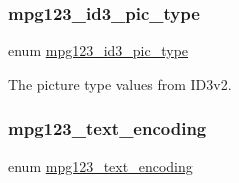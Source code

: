 \subsubsection{\texorpdfstring{mpg123\+\_\+id3\+\_\+pic\+\_\+type}{mpg123\_id3\_pic\_type}\hspace{0.1cm}{\footnotesize\ttfamily [2/2]}}
{\footnotesize\ttfamily enum \hyperlink{group__mpg123__metadata_gaf40652195dd80e2b06dc031c9902840e}{mpg123\+\_\+id3\+\_\+pic\+\_\+type}}

The picture type values from I\+D3v2. \mbox{\label{group__mpg123__metadata_ga489b4cd5fb8d1d826e38b09bed9294ce}} 
\subsubsection{\texorpdfstring{mpg123\+\_\+text\+\_\+encoding}{mpg123\_text\_encoding}\hspace{0.1cm}{\footnotesize\ttfamily [1/2]}}
{\footnotesize\ttfamily enum \hyperlink{group__mpg123__metadata_ga489b4cd5fb8d1d826e38b09bed9294ce}{mpg123\+\_\+text\+\_\+encoding}}

